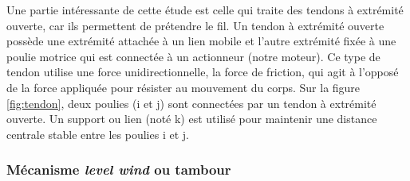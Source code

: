 \documentclass[a4paper, 11pt]{report}
\begin{document}
            Une partie intéressante de cette étude est celle qui traite des tendons à extrémité ouverte, car ils permettent de prétendre le fil. Un tendon à extrémité ouverte possède une extrémité attachée à un lien mobile et l'autre extrémité fixée à une poulie motrice qui est connectée à un actionneur (notre moteur). Ce type de tendon utilise une force unidirectionnelle, la force de friction, qui agit à l'opposé de la force appliquée pour résister au mouvement du corps. Sur la figure \ref{fig:tendon}, deux poulies (i et j) sont connectées par un tendon à extrémité ouverte. Un support ou lien (noté k) est utilisé pour maintenir une distance centrale stable entre les poulies i et j. \cite{saputro_investigation_2023}

        \subsubsection{Mécanisme \textit{level wind} ou tambour}
\end{document}
